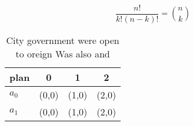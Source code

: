 \documentclass[a4paper]{article}
\begin{document}
\[ \frac{n!}{k!(n-k)!} = \binom{n}{k} \]

\begin{table}
\begin{adjustbox}{width=0.6\columnwidth}
\begin{tabular}{|l|l|l|l|}
\hline
\textbf{plan} & \multicolumn{1}{c|}{\textbf{0}} & \multicolumn{1}{c|}{\textbf{1}} & \multicolumn{1}{c|}{\textbf{2}} \\ \hline
\textbf{$a_0$}  & (0,0) & (1,0) & (2,0) \\ \hline
\textbf{$a_1$}  & (0,0) & (1,0) & (2,0) \\ \hline
\end{tabular}
\end{adjustbox}
\caption{City government were open to oreign Was also and 
}
\end{table}
\end{document}
